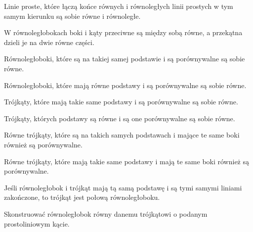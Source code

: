 \begin{euclid_theorem}
    Linie proste, które łączą końce równych i równoległych linii prostych w tym samym kierunku są sobie równe i równoległe.
\end{euclid_theorem}

\begin{euclid_theorem}
    W równoległobokach boki i kąty przeciwne są między sobą równe, a przekątna dzieli je na dwie równe części.
\end{euclid_theorem}

\begin{euclid_theorem}
    Równoległoboki, które są na takiej samej podstawie i są porównywalne są sobie równe.
\end{euclid_theorem}

\begin{euclid_theorem}
    Równoległoboki, które mają równe podstawy i są porównywalne są sobie równe.
\end{euclid_theorem}

\begin{euclid_theorem}
    Trójkąty, które mają takie same podstawy i są porównywalne są sobie równe.
\end{euclid_theorem}

\begin{euclid_theorem}
    Trójkąty, których podstawy są równe i są one porównywalne są sobie równe.
\end{euclid_theorem}

\begin{euclid_theorem}
    Równe trójkąty, które są na takich samych podstawach i mające te same boki również są porównywalne.
\end{euclid_theorem}

\begin{euclid_theorem}
    Równe trójkąty, które mają takie same podstawy i mają te same boki również są porównywalne.
\end{euclid_theorem}

\begin{euclid_theorem}
    Jeśli równoległobok i trójkąt mają tą samą podstawę i są tymi samymi liniami zakończone, to trójkąt jest połową równoległoboku.
\end{euclid_theorem}

\begin{euclid_theorem}
    Skonstruować równoległobok równy danemu trójkątowi o podanym prostoliniowym kącie.
\end{euclid_theorem}


